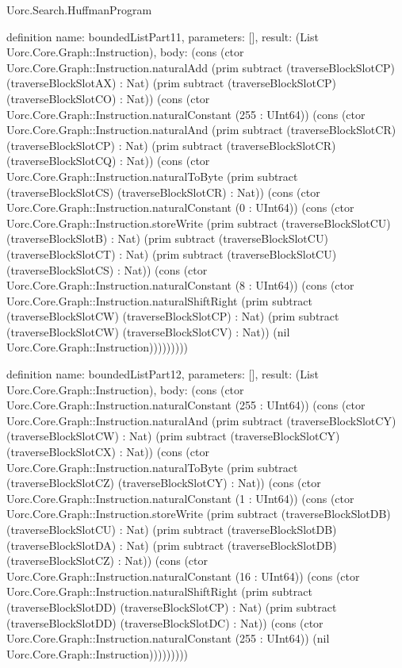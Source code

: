 \begin{lexlean}{Uorc.Search.HuffmanProgram}
\begin{semanticmodule}
definition{
  name: boundedListPart11,
  parameters: [],
  result: (List Uorc.Core.Graph::Instruction),
  body: (cons (ctor Uorc.Core.Graph::Instruction.naturalAdd (prim subtract (traverseBlockSlotCP) (traverseBlockSlotAX) : Nat) (prim subtract (traverseBlockSlotCP) (traverseBlockSlotCO) : Nat)) (cons (ctor Uorc.Core.Graph::Instruction.naturalConstant (255 : UInt64)) (cons (ctor Uorc.Core.Graph::Instruction.naturalAnd (prim subtract (traverseBlockSlotCR) (traverseBlockSlotCP) : Nat) (prim subtract (traverseBlockSlotCR) (traverseBlockSlotCQ) : Nat)) (cons (ctor Uorc.Core.Graph::Instruction.naturalToByte (prim subtract (traverseBlockSlotCS) (traverseBlockSlotCR) : Nat)) (cons (ctor Uorc.Core.Graph::Instruction.naturalConstant (0 : UInt64)) (cons (ctor Uorc.Core.Graph::Instruction.storeWrite (prim subtract (traverseBlockSlotCU) (traverseBlockSlotB) : Nat) (prim subtract (traverseBlockSlotCU) (traverseBlockSlotCT) : Nat) (prim subtract (traverseBlockSlotCU) (traverseBlockSlotCS) : Nat)) (cons (ctor Uorc.Core.Graph::Instruction.naturalConstant (8 : UInt64)) (cons (ctor Uorc.Core.Graph::Instruction.naturalShiftRight (prim subtract (traverseBlockSlotCW) (traverseBlockSlotCP) : Nat) (prim subtract (traverseBlockSlotCW) (traverseBlockSlotCV) : Nat)) (nil Uorc.Core.Graph::Instruction)))))))))
}

definition{
  name: boundedListPart12,
  parameters: [],
  result: (List Uorc.Core.Graph::Instruction),
  body: (cons (ctor Uorc.Core.Graph::Instruction.naturalConstant (255 : UInt64)) (cons (ctor Uorc.Core.Graph::Instruction.naturalAnd (prim subtract (traverseBlockSlotCY) (traverseBlockSlotCW) : Nat) (prim subtract (traverseBlockSlotCY) (traverseBlockSlotCX) : Nat)) (cons (ctor Uorc.Core.Graph::Instruction.naturalToByte (prim subtract (traverseBlockSlotCZ) (traverseBlockSlotCY) : Nat)) (cons (ctor Uorc.Core.Graph::Instruction.naturalConstant (1 : UInt64)) (cons (ctor Uorc.Core.Graph::Instruction.storeWrite (prim subtract (traverseBlockSlotDB) (traverseBlockSlotCU) : Nat) (prim subtract (traverseBlockSlotDB) (traverseBlockSlotDA) : Nat) (prim subtract (traverseBlockSlotDB) (traverseBlockSlotCZ) : Nat)) (cons (ctor Uorc.Core.Graph::Instruction.naturalConstant (16 : UInt64)) (cons (ctor Uorc.Core.Graph::Instruction.naturalShiftRight (prim subtract (traverseBlockSlotDD) (traverseBlockSlotCP) : Nat) (prim subtract (traverseBlockSlotDD) (traverseBlockSlotDC) : Nat)) (cons (ctor Uorc.Core.Graph::Instruction.naturalConstant (255 : UInt64)) (nil Uorc.Core.Graph::Instruction)))))))))
}


\end{semanticmodule}
\end{lexlean}
